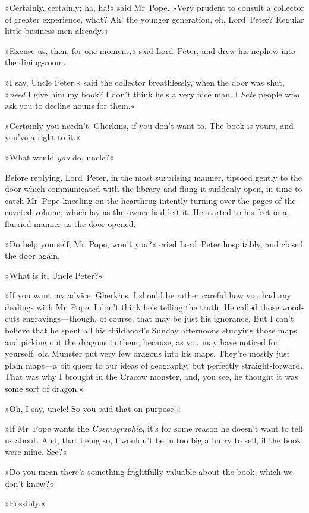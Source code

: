 »Certainly, certainly; ha, ha!« said Mr~Pope. »Very prudent to consult a collector of greater experience, what? Ah! the younger generation, eh, Lord~Peter? Regular little business men already.«

»Excuse us, then, for one moment,« said Lord~Peter, and drew his nephew into the dining-room.

»I say, Uncle Peter,« said the collector breathlessly, when the door was shut, »\textit{need} I give him my book? I don't think he's a very nice man. I \textit{hate} people who ask you to decline nouns for them.«

»Certainly you needn't, Gherkins, if you don't want to. The book is yours, and you've a right to it.«

»What would \textit{you} do, uncle?«

Before replying, Lord~Peter, in the most surprising manner, tiptoed gently to the door which communicated with the library and flung it suddenly open, in time to catch Mr~Pope kneeling on the hearthrug intently turning over the pages of the coveted volume, which lay as the owner had left it. He started to his feet in a flurried manner as the door opened.

»Do help yourself, Mr~Pope, won't you?« cried Lord~Peter hospitably, and closed the door again.

»What is it, Uncle Peter?«

»If you want my advice, Gherkins, I should be rather careful how you had any dealings with Mr~Pope. I don't think he's telling the truth. He called those wood-cuts engravings—though, of course, that may be just his ignorance. But I can't believe that he spent all his childhood's Sunday afternoons studying those maps and picking out the dragons in them, because, as you may have noticed for yourself, old Munster put very few dragons into his maps. They're mostly just plain maps—a bit queer to our ideas of geography, but perfectly straight-forward. That was why I brought in the Cracow monster, and, you see, he thought it was some sort of dragon.«

»Oh, I say, uncle! So you said that on purpose!«

»If Mr~Pope wants the \textit{Cosmographia}, it's for some reason he doesn't want to tell us about. And, that being so, I wouldn't be in too big a hurry to sell, if the book were mine. See?«

»Do you mean there's something frightfully valuable about the book, which we don't know?«

»Possibly.«

